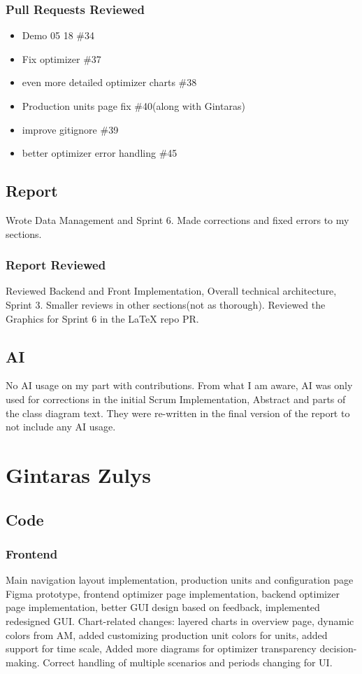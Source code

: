 \subsubsection*{Pull Requests Reviewed}
\begin{itemize}
    \item Demo 05 18 \#34
    \item Fix optimizer \#37
    \item even more detailed optimizer charts \#38
    \item Production units page fix \#40(along with Gintaras)
    \item improve gitignore \#39
    \item better optimizer error handling \#45

\end{itemize}
\subsection*{Report}
Wrote Data Management and Sprint 6. Made corrections and fixed errors to my sections.
\subsubsection*{Report Reviewed}
Reviewed Backend and Front Implementation, Overall technical architecture, Sprint 3. Smaller reviews in other sections(not as thorough). Reviewed the Graphics for Sprint 6 in the LaTeX repo PR.
\subsection*{AI}
No AI usage on my part with contributions. From what I am aware, AI was only used for corrections in the initial Scrum Implementation, Abstract and parts of the class diagram text. They were re-written in the final version of the report to not include any AI usage.

\section*{Gintaras Zulys}
\subsection*{Code}
\subsubsection*{Frontend}
Main navigation layout implementation, production units and configuration page Figma prototype, frontend optimizer page implementation, backend optimizer page implementation, better GUI design based on feedback, implemented redesigned GUI. Chart-related changes: layered charts in overview page, dynamic colors from AM, added customizing production unit colors for units, added support for time scale, Added more diagrams for optimizer transparency decision-making. Correct handling of multiple scenarios and periods changing for UI.
